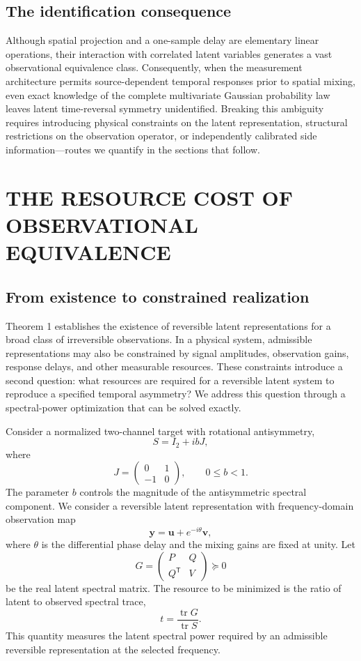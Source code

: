 \documentclass[aps,pre,reprint,amsmath,amssymb,superscriptaddress]{revtex4-2}
\begin{document}
\subsection{The identification consequence}

Although spatial projection and a one-sample delay are elementary linear operations, their interaction with correlated latent variables generates a vast observational equivalence class. Consequently, when the measurement architecture permits source-dependent temporal responses prior to spatial mixing, even exact knowledge of the complete multivariate Gaussian probability law leaves latent time-reversal symmetry unidentified. Breaking this ambiguity requires introducing physical constraints on the latent representation, structural restrictions on the observation operator, or independently calibrated side information---routes we quantify in the sections that follow.

\section{THE RESOURCE COST OF OBSERVATIONAL EQUIVALENCE}

\subsection{From existence to constrained realization}

Theorem 1 establishes the existence of reversible latent representations for a broad class of irreversible observations. In a physical system, admissible representations may also be constrained by signal amplitudes, observation gains, response delays, and other measurable resources.
These constraints introduce a second question: what resources are required for a reversible latent system to reproduce a specified temporal asymmetry?
We address this question through a spectral-power optimization that can be solved exactly.


Consider a normalized two-channel target with rotational antisymmetry,
\begin{equation}\label{eq:13}
\boxed{
S=I_2+ibJ,
}
\end{equation}
where
\[
J=
\begin{pmatrix}
0&1\\
-1&0
\end{pmatrix},
\qquad
0\le b<1.
\]
The parameter \(b\) controls the magnitude of the antisymmetric spectral component.
We consider a reversible latent representation with frequency-domain observation map
\[
\mathbf y=\mathbf u+e^{-i\theta}\mathbf v,
\]
where \(\theta\) is the differential phase delay and the mixing gains are fixed at unity.
Let
\[
G=
\begin{pmatrix}
P&Q\\
Q^{\mathsf T}&V
\end{pmatrix}
\succeq0
\]
be the real latent spectral matrix.
The resource to be minimized is the ratio of latent to observed spectral trace,
\[
t=
\frac{\operatorname{tr}G}{\operatorname{tr}S}.
\]
This quantity measures the latent spectral power required by an admissible reversible representation at the selected frequency.
\end{document}
